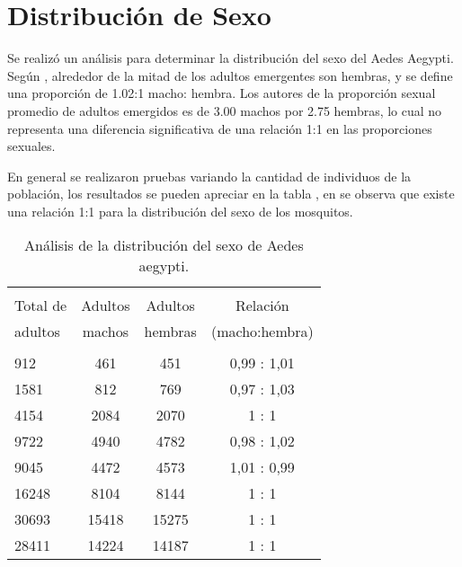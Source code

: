\section{Distribución de Sexo}
Se realizó un análisis para determinar la distribución del sexo del Aedes Aegypti. Según
\cite{otero2006stochastic}, alrededor de la mitad de los adultos emergentes son hembras,
y se define una proporción de 1.02:1 macho: hembra. Los autores de \cite{manrique1998desarrollo}
la proporción sexual promedio de adultos emergidos es de 3.00 machos por 2.75 hembras, lo cual
no representa una diferencia significativa de una relación 1:1 en las proporciones sexuales.

En general se realizaron pruebas variando la cantidad de individuos de la población, los resultados se
pueden apreciar en la tabla , en se observa que existe una relación 1:1
para la distribución del sexo de los mosquitos.

\begin{table}
    \begin{center}
        \caption{ \label{tab:distribucion-sexo-test} Análisis de la distribución del sexo de Aedes
        aegypti.}
        \begin{tabular}{p{3cm} c c c }
            \hline \\
            Total de & Adultos & Adultos & Relación \\
            adultos  & machos  & hembras & (macho:hembra) \\
            \hline
            \hline \\
            912    &  461    &  451    &  0,99 : 1,01 \\
            1581   &  812    &  769    &  0,97 : 1,03 \\
            4154   &  2084   &  2070   &  1    : 1 \\
            9722   &  4940   &  4782   &  0,98 : 1,02 \\
            9045   &  4472   &  4573   &  1,01 : 0,99 \\
            16248  &  8104   &  8144   &  1    : 1 \\
            30693  &  15418  &  15275  &  1    : 1 \\
            28411  &  14224  &  14187  &  1    : 1 \\
        \end{tabular}

    \end{center}
\end{table}
